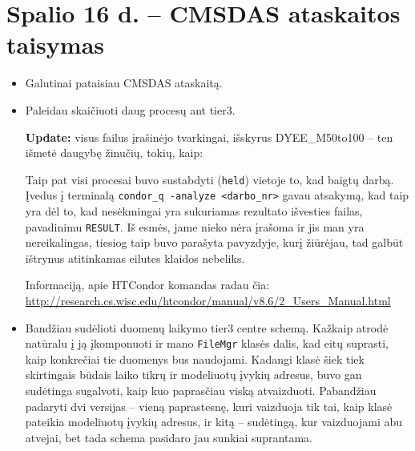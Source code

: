 \documentclass[a4paper, 12pt]{article}
\newcommand{\ttt}[1]{\texttt{#1}}
\begin{document}
\section{Spalio 16 d. -- CMSDAS ataskaitos taisymas}
\begin{itemize}
	\item Galutinai pataisiau CMSDAS ataskaitą.
	\item Paleidau skaičiuoti daug procesų ant tier3.
	
	\textbf{Update:} visus failus įrašinėjo tvarkingai, išskyrus DYEE\_M50to100 --
	ten išmetė daugybę žinučių, tokių, kaip:
	
	\ttt{} %
	
	Taip pat visi procesai buvo sustabdyti (\ttt{held}) vietoje to, kad baigtų darbą.
	Įvedus į terminalą \ttt{condor\_q -analyze <darbo\_nr>} gavau atsakymą, kad taip yra
	dėl to, kad nesėkmingai yra sukuriamas rezultato išvesties failas, pavadinimu
	\ttt{RESULT}. Iš esmės, jame nieko nėra įrašoma ir jis man yra nereikalingas, tiesiog
	taip buvo parašyta pavyzdyje, kurį žiūrėjau, tad galbūt ištrynus atitinkamas eilutes
	klaidos nebeliks.
	
	Informaciją, apie HTCondor komandas radau čia:
	\url{http://research.cs.wisc.edu/htcondor/manual/v8.6/2_Users_Manual.html}
	
	\item Bandžiau sudėlioti duomenų laikymo tier3 centre schemą. Kažkaip atrodė natūralu
	į ją įkomponuoti ir mano \ttt{FileMgr} klasės dalis, kad eitų suprasti, kaip
	konkrečiai tie duomenys bus naudojami. Kadangi klasė šiek tiek skirtingais būdais
	laiko tikrų ir modeliuotų įvykių adresus, buvo gan sudėtinga sugalvoti, kaip kuo
	paprasčiau viską atvaizduoti. Pabandžiau padaryti dvi versijas -- vieną paprastesnę,
	kuri vaizduoja tik tai, kaip klasė pateikia modeliuotų įvykių adresus, ir kitą --
	sudėtingą, kur vaizduojami abu atvejai, bet tada schema pasidaro jau sunkiai suprantama.
	

\end{itemize}
\end{document}
